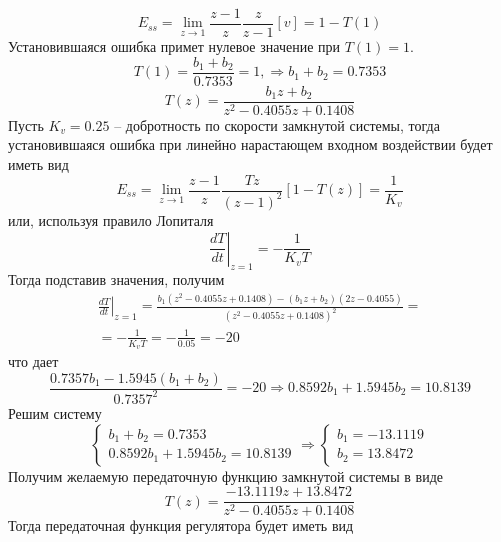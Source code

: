 \begin{equation}
	E_{ss} = \lim\limits_{z \to 1} \frac{z - 1}{z} \frac{z}{z - 1} [v] = 1 - T(1)
\end{equation}
Установившаяся ошибка примет нулевое значение при $T(1) = 1$. 
\begin{equation}
	T(1) = \frac{b_1 + b_2}{0.7353} = 1, \Rightarrow b_1 + b_2 = 0.7353
\end{equation}
\begin{equation}
T(z) =	\frac{b_1 z + b_2}{z^2 -0.4055 z + 0.1408}
\end{equation}
Пусть $K_v = 0.25$ -- добротность по скорости замкнутой системы, тогда установившаяся ошибка при линейно нарастающем входном воздействии будет иметь вид
\begin{equation}
	E_{ss} = \lim \limits_{z \to 1} \frac{z-1}{z} \frac{Tz}{\left(z-1\right)^2} \left[1 - T(z)\right] = \frac{1}{K_v}
\end{equation}
или, используя правило Лопиталя
\begin{equation}
	\left. \frac{dT}{dt}\right|_{z=1} = - \frac{1}{K_v T}
\end{equation}
Тогда подставив значения, получим
\begin{multline}
		\left. \frac{dT}{dt}\right|_{z=1} = \frac{b_1 \left(z^2 - 0.4055 z + 0.1408\right) - \left(b_1 z + b_2\right) \left(2z - 0.4055\right)}{\left(z^2 - 0.4055 z + 0.1408\right)^2} = \\ =
		- \frac{1}{K_v T} = -\frac{1}{0.05} = -20
\end{multline}
что дает
\begin{equation}
	\frac{0.7357 b_1 - 1.5945\left(b_1 + b_2\right)}{0.7357^2} = -20 \Rightarrow 0.8592 b_1 + 1.5945 b_2 = 10.8139
\end{equation}
Решим систему
\begin{equation}
	\begin{cases}
		b_1 + b_2 = 0.7353\\
		0.8592 b_1 + 1.5945 b_2 = 10.8139
	\end{cases} \Rightarrow \begin{cases}
	b_1 = -13.1119\\
	b_2 = 13.8472
	\end{cases}
\end{equation}
Получим желаемую передаточную функцию замкнутой системы в виде
\begin{equation}
	T(z) = \frac{-13.1119z + 13.8472}{z^2 -0.4055 z + 0.1408}
\end{equation}
Тогда передаточная функция регулятора будет иметь вид
